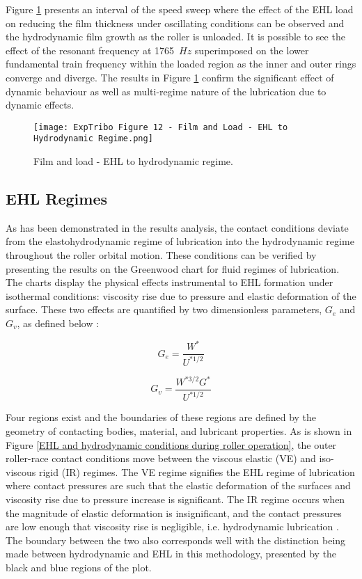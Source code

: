Figure \ref{Film and load - EHL to hydrodynamic regime} presents an interval of the speed sweep where the effect of the EHL load on reducing the film thickness under oscillating conditions can be observed and the hydrodynamic film growth as the roller is unloaded. It is possible to see the effect of the resonant frequency at 1765~$Hz$ superimposed on the lower fundamental train frequency within the loaded region as the inner and outer rings converge and diverge. The results in Figure \ref{Film and load - EHL to hydrodynamic regime} confirm the significant effect of dynamic behaviour as well as multi-regime nature of the lubrication due to dynamic effects.

\begin{figure}
	\centering
	\texttt{[image: ExpTribo Figure 12 - Film and Load - EHL to Hydrodynamic Regime.png]}
	\caption{Film and load - EHL to hydrodynamic regime.}
	\label{Film and load - EHL to hydrodynamic regime}
\end{figure} 

\subsection{EHL Regimes} \label{Greenwood EHL Regimes}

As has been demonstrated in the results analysis, the contact conditions deviate from the elastohydrodynamic regime of lubrication into the hydrodynamic regime throughout the roller orbital motion. These conditions can be verified by presenting the results on the Greenwood chart for fluid regimes of lubrication. The charts display the physical effects instrumental to EHL formation under isothermal conditions: viscosity rise due to pressure and elastic deformation of the surface. These two effects are quantified by two dimensionless parameters, $G_e$ and $G_v$, as defined below \cite{Gohar1988}: 

\begin{equation}\label{GoharGe}
	G_e=\frac{W^*}{U^{* 1 / 2}}
\end{equation}

\begin{equation}\label{GoharGv}
	G_v=\frac{W^{* 3 / 2} G^*}{U^{* 1 / 2}}
\end{equation}

Four regions exist and the boundaries of these regions are defined by the geometry of contacting bodies, material, and lubricant properties. As is shown in Figure \ref{EHL and hydrodynamic conditions during roller operation}, the outer roller-race contact conditions move between the viscous elastic (VE) and iso-viscous rigid (IR) regimes. The VE regime signifies the EHL regime of lubrication where contact pressures are such that the elastic deformation of the surfaces and viscosity rise due to pressure increase is significant. The IR regime occurs when the magnitude of elastic deformation is insignificant, and the contact pressures are low enough that viscosity rise is negligible, i.e. hydrodynamic lubrication \cite{Hamrock1980}. The boundary between the two also corresponds well with the distinction being made between hydrodynamic and EHL in this methodology, presented by the black and blue regions of the plot.

